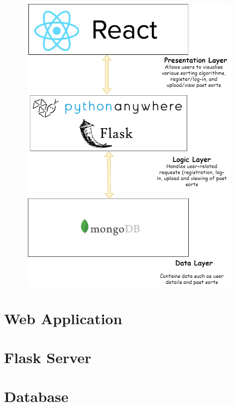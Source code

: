 \begin{center}
    \includegraphics[width=15cm,height=15cm,keepaspectratio]{images/system_design}
\end{center}
\newpage

\section{Web Application}

\section{Flask Server}

\section{Database}
